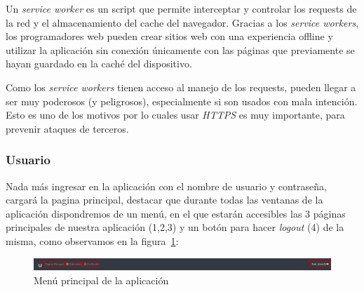 \documentclass[a4paper, 12pt]{book}
\begin{document}
	Un \emph{service worker} es un script que permite interceptar y controlar los requests de la red y el almacenamiento del cache del navegador. Gracias a los \textit{service workers}, los programadores web pueden crear sitios web con una experiencia offline y utilizar la aplicación sin conexión únicamente con las páginas que previamente se hayan guardado en la caché del dispositivo.
	
	Como los \textit{service workers} tienen acceso al manejo de los requests, pueden llegar a ser muy poderosos (y peligrosos), especialmente si son usados con mala intención. Esto es uno de los motivos por lo cuales usar \textit{HTTPS} es muy importante, para prevenir ataques de terceros.

\subsubsection{Usuario}
	Nada más ingresar en la aplicación con el nombre de usuario y contraseña, cargará la pagina principal, destacar que durante todas las ventanas de la aplicación dispondremos de un menú, en el que estarán accesibles las 3 páginas principales de nuestra aplicación (1,2,3) y un botón para hacer \textit{logout} (4) de la misma, como observamos en la figura~\ref{fig:menu}:
	\begin{figure}
  	\centering
  	\includegraphics[width=16cm, keepaspectratio]{img/menu.png}
  	\caption{Menú principal de la aplicación}\label{fig:menu}
	\end{figure}
	
\end{document}
